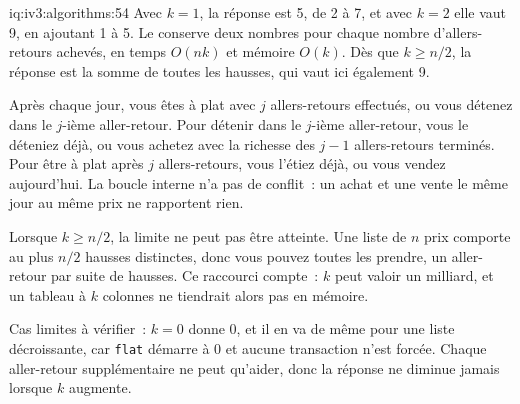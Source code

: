 \begin{solution}{iq:iv3:algorithms:54}
Avec $k = 1$, la réponse est 5, de 2 à 7, et avec $k = 2$ elle vaut 9, en ajoutant 1 à 5. Le  conserve deux nombres pour chaque nombre d'allers-retours achevés, en temps $O(nk)$ et mémoire $O(k)$. Dès que $k \ge n/2$, la réponse est la somme de toutes les hausses, qui vaut ici également 9.
\label{lst:iv3:al:ktrades}

Après chaque jour, vous êtes à plat avec $j$ allers-retours effectués, ou vous détenez dans le $j$-ième aller-retour. Pour détenir dans le $j$-ième aller-retour, vous le déteniez déjà, ou vous achetez avec la richesse des $j - 1$ allers-retours terminés. Pour être à plat après $j$ allers-retours, vous l'étiez déjà, ou vous vendez aujourd'hui. La boucle interne n'a pas de conflit~: un achat et une vente le même jour au même prix ne rapportent rien.

Lorsque $k \ge n/2$, la limite ne peut pas être atteinte. Une liste de $n$ prix comporte au plus $n/2$ hausses distinctes, donc vous pouvez toutes les prendre, un aller-retour par suite de hausses. Ce raccourci compte~: $k$ peut valoir un milliard, et un tableau à $k$ colonnes ne tiendrait alors pas en mémoire.

Cas limites à vérifier~: $k = 0$ donne 0, et il en va de même pour une liste décroissante, car \texttt{flat} démarre à 0 et aucune transaction n'est forcée. Chaque aller-retour supplémentaire ne peut qu'aider, donc la réponse ne diminue jamais lorsque $k$ augmente.

\end{solution}

